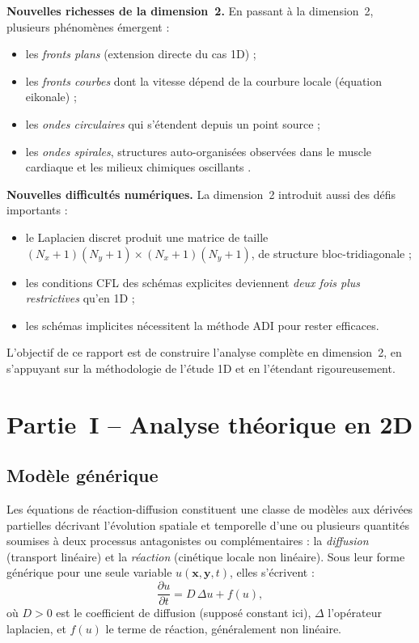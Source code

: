 \documentclass[11pt,a4paper]{report}
\begin{document}
\medskip
\noindent\textbf{Nouvelles richesses de la dimension~2.} En passant \`a la dimension~2,
plusieurs ph\'enom\`enes \'emergent :
\begin{itemize}[leftmargin=1.5em]
  \item les \emph{fronts plans} (extension directe du cas 1D) ;
  \item les \emph{fronts courbes} dont la vitesse d\'epend de la courbure locale
        (\'equation eikonale) ;
  \item les \emph{ondes circulaires} qui s'\'etendent depuis un point source ;
  \item les \emph{ondes spirales}, structures auto-organis\'ees observ\'ees
        dans le muscle cardiaque et les milieux chimiques oscillants \cite{Winfree1980}.
\end{itemize}

\medskip
\noindent\textbf{Nouvelles difficult\'es num\'eriques.} La dimension~2 introduit aussi des
d\'efis importants :
\begin{itemize}[leftmargin=1.5em]
  \item le Laplacien discret produit une matrice de taille $(N_x{+}1)(N_y{+}1) \times
        (N_x{+}1)(N_y{+}1)$, de structure bloc-tridiagonale ;
  \item les conditions CFL des sch\'emas explicites deviennent \emph{deux fois plus
        restrictives} qu'en 1D ;
  \item les sch\'emas implicites n\'ecessitent la m\'ethode ADI pour rester efficaces.
\end{itemize}

L'objectif de ce rapport est de construire l'analyse compl\`ete en dimension~2,
en s'appuyant sur la m\'ethodologie de l'\'etude 1D et en l'\'etendant rigoureusement.

\chapter{Partie~I -- Analyse th\'eorique en 2D}

\section{Modèle générique}

Les équations de réaction-diffusion constituent une classe de modèles aux dérivées partielles décrivant l'évolution spatiale et temporelle d'une ou plusieurs quantités soumises à deux processus antagonistes ou complémentaires : la \textit{diffusion} (transport linéaire) et la \textit{réaction} (cinétique locale non linéaire). Sous leur forme générique pour une seule variable $u(\mathbf{x},\mathbf{y}, t)$, elles s'écrivent :
\[
\frac{\partial u}{\partial t} = D\,\Delta u + f(u),
\]
où $D > 0$ est le coefficient de diffusion (supposé constant ici), $\Delta$ l'opérateur laplacien, et $f(u)$ le terme de réaction, généralement non linéaire.
\end{document}
